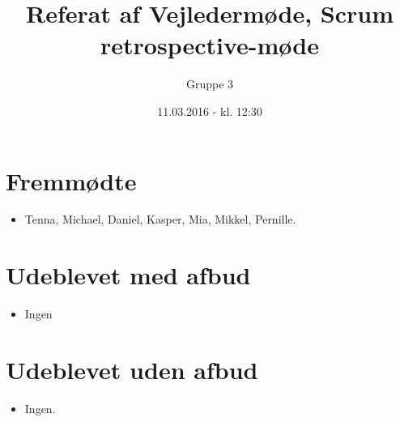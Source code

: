 \documentclass{article}
\title{Referat af Vejledermøde, Scrum retrospective-møde }
\author{Gruppe 3}
\date{11.03.2016 - kl. 12:30}
\begin{document}
	\maketitle
	
	\section{Fremmødte}
	\begin{itemize}
		\item Tenna, Michael, Daniel, Kasper, Mia, Mikkel, Pernille. 
	\end{itemize}
	
	\section{Udeblevet med afbud}
	\begin{itemize}
		\item Ingen
	\end{itemize}
	
	\section{Udeblevet uden afbud}
	\begin{itemize}
		\item Ingen.
	\end{itemize}
	
\end{document}

